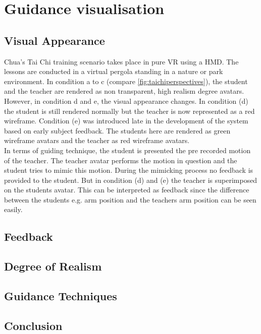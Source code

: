 \section{Guidance visualisation}
\subsection{Visual Appearance}
Chua's Tai Chi training scenario takes place in pure VR using a HMD. The lessons are conducted in a virtual pergola standing in a nature or park environment. In condition a to c (compare \ref{fig:taichiperspectives}), the student and the teacher are rendered as non transparent, high realism degree avatars. However, in condition d and e, the visual appearance changes. In condition (d) the student is still rendered normally but the teacher is now represented as a red wireframe. Condition (e) was introduced late in the development of the system based on early subject feedback. The students here are rendered as green wireframe avatars and the teacher as red wireframe avatars.\\
In terms of guiding technique, the student is presented the pre recorded motion of the teacher. The teacher avatar performs the motion in question and the student tries to mimic this motion. During the mimicking process no feedback is provided to the student. But in condition (d) and (e) the teacher is superimposed on the students avatar. This can be interpreted as feedback since the difference between the students e.g. arm position and the teachers arm position can be seen easily.

\subsection{Feedback}
\subsection{Degree of Realism}
\subsection{Guidance Techniques}
\subsection{Conclusion}

